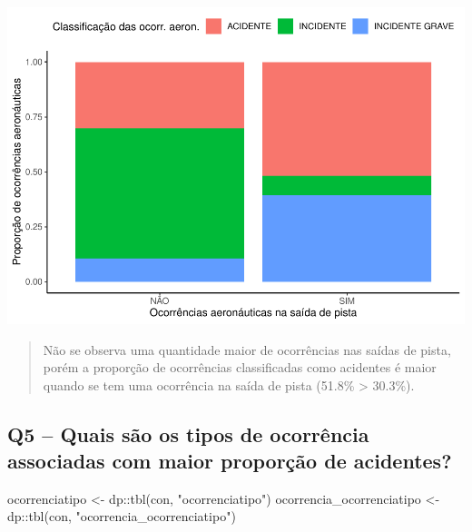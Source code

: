 \documentclass[
]{article}
\newenvironment{Shaded}{\begin{snugshade}}{\end{snugshade}}
\newcommand{\FunctionTok}[1]{\textcolor[rgb]{0.00,0.00,0.00}{#1}}
\newcommand{\NormalTok}[1]{#1}
\newcommand{\OtherTok}[1]{\textcolor[rgb]{0.56,0.35,0.01}{#1}}
\newcommand{\SpecialCharTok}[1]{\textcolor[rgb]{0.00,0.00,0.00}{#1}}
\newcommand{\StringTok}[1]{\textcolor[rgb]{0.31,0.60,0.02}{#1}}
\begin{document}
\begin{center}\includegraphics[width=1\linewidth]{../4.Relatorio/pdf/index_files/figure-latex/unnamed-chunk-40-1} \end{center}

\begin{quote}
Não se observa uma quantidade maior de ocorrências nas saídas de pista,
porém a proporção de ocorrências classificadas como acidentes é maior
quando se tem uma ocorrência na saída de pista (51.8\% \textgreater{}
30.3\%).
\end{quote}

\hypertarget{q5-quais-suxe3o-os-tipos-de-ocorruxeancia-associadas-com-maior-proporuxe7uxe3o-de-acidentes}{%
\subsection{Q5 -- Quais são os tipos de ocorrência associadas com maior
proporção de
acidentes?}\label{q5-quais-suxe3o-os-tipos-de-ocorruxeancia-associadas-com-maior-proporuxe7uxe3o-de-acidentes}}

\begin{Shaded}
\begin{Highlighting}[]
\NormalTok{ocorrenciatipo }\OtherTok{\textless{}{-}}\NormalTok{ dp}\SpecialCharTok{::}\FunctionTok{tbl}\NormalTok{(con, }\StringTok{"ocorrenciatipo"}\NormalTok{)}
\NormalTok{ocorrencia\_ocorrenciatipo }\OtherTok{\textless{}{-}}\NormalTok{ dp}\SpecialCharTok{::}\FunctionTok{tbl}\NormalTok{(con, }\StringTok{"ocorrencia\_ocorrenciatipo"}\NormalTok{)}
\end{Highlighting}
\end{Shaded}
\end{document}
